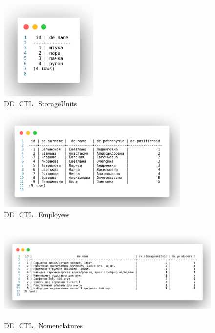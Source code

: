 \begin{figure}[!h]
    \centering

    \includegraphics[height=5cm]
    {assets/sql/DE_CTL_StorageUnits.png}

    \caption{DE\_CTL\_StorageUnits}
    
    \label{fig:CPR_EdinicyHraneniay}
\end{figure}

\begin{figure}[!h]
    \centering

    \includegraphics[height=5cm]
    {assets/sql/DE_CTL_Employees.png}

    \caption{DE\_CTL\_Employees}

    \label{fig:CPR_Sotrudniki}
\end{figure}


\begin{figure}[!h]
    \centering

    \includegraphics[height=5cm]
    {assets/sql/DE_CTL_Nomenclatures.png}

    \caption{DE\_CTL\_Nomenclatures}

    \label{fig:CPR_Nomenklatura}
\end{figure}

